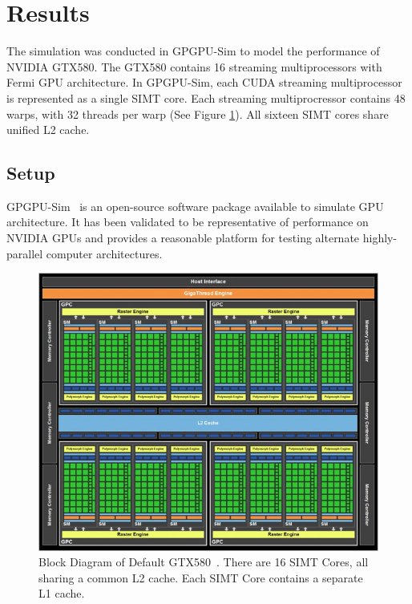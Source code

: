 \section{Results}

The simulation was conducted in GPGPU-Sim to model the performance of NVIDIA GTX580\cite{bakhodayuan09}. 
The GTX580 contains 16 streaming multiprocessors with Fermi GPU architecture. 
In GPGPU-Sim, each CUDA streaming multiprocessor is represented as a single SIMT core. 
Each streaming multiprocressor contains 48 warps, with 32 threads per
warp (See Figure \ref{GTX580}). 
All sixteen SIMT cores share unified L2 cache.

\subsection{Setup}

GPGPU-Sim~\cite{bakhodayuan09} is an open-source software package
available to simulate GPU architecture. 
It has been validated to be representative of performance on NVIDIA
GPUs and provides a reasonable platform for testing alternate
highly-parallel computer architectures.

\begin{figure}[ht!]
\centering
\includegraphics[width=\columnwidth]{graphics/GTX580.jpg}
\caption{Block Diagram of Default GTX580~\cite{gf100}. There are 16 SIMT Cores, 
all sharing a common L2 cache. Each SIMT Core contains a separate L1 cache.}
\label{GTX580}
\end{figure}

